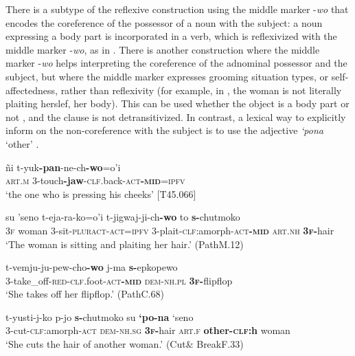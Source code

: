 \documentclass[output=paper]{langscibook}
\begin{document}
There is a subtype of the reflexive construction using the middle marker -\textit{wo} that encodes the coreference of the possessor of a noun with the subject: a noun expressing a body part is incorporated in a verb, which is reflexivized with the middle marker -\textit{wo}, as in . There is another construction where the middle marker -\textit{wo} helps interpreting the coreference of the adnominal possessor and the subject, but where the middle marker expresses grooming situation types, or self-affectedness, rather than reflexivity (for example, in , the woman is not literally plaiting herslef, her body). This can be used whether the object is a body part  or not , and the clause is not detransitivized. In contrast, a lexical way to explicitly inform on the non-coreference with the subject is to use the adjective \textit{‘pona} ‘other’ .


\ea
\label{ex:Rose:24}
\gll ñi t-yuk\textbf{-pan}-ne-ch\textbf{-wo}=o'i \\
\textsc{art.m} 3-touch\textbf{-jaw}-\textsc{clf.}back-\textsc{act\textbf{-mid}=ipfv}\\
\glt ‘the one who is pressing his cheeks’ [T45.066]
\z

\ea
\label{ex:Rose:25}
\gll su 'seno t-eja-ra-ko=o'i t-jigwaj-ji-ch\textbf{-wo} to \textbf{s-}chutmoko\\
3\textsc{f} woman 3-sit-\textsc{pluract-act=ipfv} 3-plait-\textsc{clf}:amorph-\textsc{act\textbf{-mid} art.nh} \textsc{\textbf{3f}}\textbf{-}hair\\
\glt ‘The woman is sitting and plaiting her hair.’ (PathM.12)
\z

\ea
\label{ex:Rose:26}
\gll t-vemju-ju-pew-cho\textbf{-wo} j-ma \textbf{s-}epkopewo \\
3-take\_off-\textsc{red}-\textsc{clf}.foot-\textsc{act\textbf{-mid}} \textsc{dem-nh.pl} \textsc{\textbf{3f-}}flipflop\\
\glt ‘She takes off her flipflop.’ (PathC.68)
\z

\ea
\label{ex:Rose:27}
\gll t-yusti-j-ko p-jo \textbf{s-}chutmoko su \textbf{`po-na} `seno\\
3-cut-\textsc{clf}:amorph-\textsc{act} \textsc{dem-nh.sg} \textsc{\textbf{3f-}}hair \textsc{art.f} \textbf{other-}\textsc{\textbf{clf}}\textbf{:h} woman\\
\glt ‘She cuts the hair of another woman.’ (Cut\& BreakF.33)
\z
\end{document}
